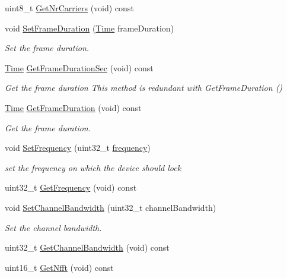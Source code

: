 \begin{DoxyCompactItemize}
uint8\+\_\+t \hyperlink{classns3_1_1WimaxPhy_a865ae5146d45776201d66b2df4266cc6}{Get\+Nr\+Carriers} (void) const 
\item 
void \hyperlink{classns3_1_1WimaxPhy_aa834d7cca63f605f92a6bd059fb2b8e7}{Set\+Frame\+Duration} (\hyperlink{classns3_1_1Time}{Time} frame\+Duration)
\begin{DoxyCompactList}\small\item\em Set the frame duration. \end{DoxyCompactList}\item 
\hyperlink{classns3_1_1Time}{Time} \hyperlink{classns3_1_1WimaxPhy_a6a427cbe9927463b71d1f65d8f136785}{Get\+Frame\+Duration\+Sec} (void) const 
\begin{DoxyCompactList}\small\item\em Get the frame duration This method is redundant with Get\+Frame\+Duration () \end{DoxyCompactList}\item 
\hyperlink{classns3_1_1Time}{Time} \hyperlink{classns3_1_1WimaxPhy_a1eb798d21c180dee88590ca66f48c407}{Get\+Frame\+Duration} (void) const 
\begin{DoxyCompactList}\small\item\em Get the frame duration. \end{DoxyCompactList}\item 
void \hyperlink{classns3_1_1WimaxPhy_a4707c4d4489ac404aa1397df3b2e88af}{Set\+Frequency} (uint32\+\_\+t \hyperlink{mmwave_2model_2fading-traces_2fading__trace__generator_8m_a09045328d6d7e16aa4013f526cc6993d}{frequency})
\begin{DoxyCompactList}\small\item\em set the frequency on which the device should lock \end{DoxyCompactList}\item 
uint32\+\_\+t \hyperlink{classns3_1_1WimaxPhy_a43dc17d09c864a9f752286bb11df13d8}{Get\+Frequency} (void) const 
\item 
void \hyperlink{classns3_1_1WimaxPhy_a1410ed7a966d0d066a1dd8f016edd444}{Set\+Channel\+Bandwidth} (uint32\+\_\+t channel\+Bandwidth)
\begin{DoxyCompactList}\small\item\em Set the channel bandwidth. \end{DoxyCompactList}\item 
uint32\+\_\+t \hyperlink{classns3_1_1WimaxPhy_a701650940d220ad625c30a08c06e85e5}{Get\+Channel\+Bandwidth} (void) const 
\item 
uint16\+\_\+t \hyperlink{classns3_1_1WimaxPhy_a2afcc3a448dfe18603862427e3166df1}{Get\+Nfft} (void) const 

\end{DoxyCompactItemize}

